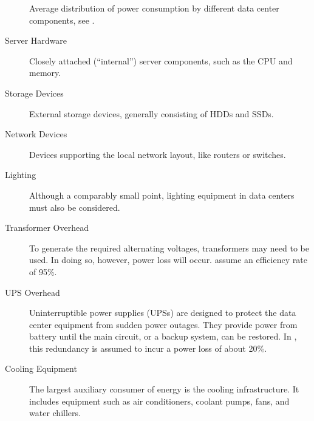 \documentclass[12pt, a4paper]{scrartcl}
\begin{document}
\begin{figure}
    \centering

    \caption{Average distribution of power consumption by different data center components, see \cite{masanet_estimating_2011}.}
    \label{fig:power-dist}
\end{figure}

\begin{description}
    \item[Server Hardware]
        Closely attached (\enquote{internal}) server components, such as the CPU and memory.

    \item[Storage Devices]
        External storage devices, generally consisting of \acp{HDD} and \acp{SSD}.

    \item[Network Devices]
        Devices supporting the local network layout, like routers or switches.

    \item[Lighting]
        Although a comparably small point, lighting equipment in data centers must also be considered.

    \item[Transformer Overhead]
        To generate the required alternating voltages, transformers may need to be used.
        In doing so, however, power loss will occur.
        \textcite{masanet_estimating_2011} assume an efficiency rate of 95\%.

    \item[UPS Overhead]
        Uninterruptible power supplies (\acp{UPS}) are designed to protect the data center equipment from sudden power outages.
        They provide power from battery until the main circuit, or a backup system, can be restored.
        In \cite{masanet_estimating_2011}, this redundancy is assumed to incur a power loss of about 20\%.

    \item[Cooling Equipment]
        The largest auxiliary consumer of energy is the cooling infrastructure.
        It includes equipment such as air conditioners, coolant pumps, fans, and water chillers.
\end{description}
\end{document}
